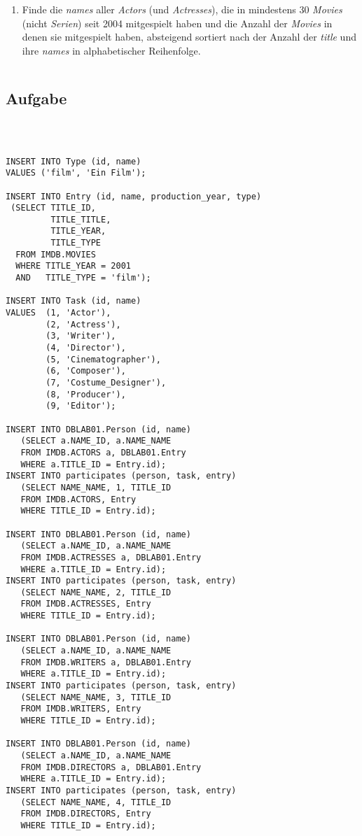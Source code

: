 \documentclass[11pt,a4paper,DIV=9]{scrartcl}
\newcounter{temp}
\newcommand{\aufgabe}[1]{
  \setcounter{temp}{\value{subsection}}
  \setcounter{subsection}{#1}
  \addtocounter{subsection}{-1}
  \subsection{Aufgabe}
  \setcounter{subsection}{\value{temp}}
}
\begin{document}
\begin{enumerate}
\item Finde die \textit{names} aller \textit{Actors} (und \textit{Actresses}), die in mindestens 30 \textit{Movies} (nicht \textit{Serien}) seit 2004 mitgespielt haben und die Anzahl der \textit{Movies} in denen sie mitgespielt haben, absteigend sortiert nach der Anzahl der \textit{title} und ihre \textit{names} in alphabetischer Reihenfolge.
\begin{lstlisting}
\end{lstlisting}
\end{enumerate}

\aufgabe{4}
\begin{lstlisting}



INSERT INTO Type (id, name)
VALUES ('film', 'Ein Film');

INSERT INTO Entry (id, name, production_year, type)
 (SELECT TITLE_ID,
         TITLE_TITLE,
         TITLE_YEAR,
         TITLE_TYPE
  FROM IMDB.MOVIES
  WHERE TITLE_YEAR = 2001
  AND   TITLE_TYPE = 'film');

INSERT INTO Task (id, name)
VALUES  (1, 'Actor'),
        (2, 'Actress'),
        (3, 'Writer'),
        (4, 'Director'),
        (5, 'Cinematographer'),
        (6, 'Composer'),
        (7, 'Costume_Designer'),
        (8, 'Producer'),
        (9, 'Editor');

INSERT INTO DBLAB01.Person (id, name)
   (SELECT a.NAME_ID, a.NAME_NAME
   FROM IMDB.ACTORS a, DBLAB01.Entry
   WHERE a.TITLE_ID = Entry.id);
INSERT INTO participates (person, task, entry)
   (SELECT NAME_NAME, 1, TITLE_ID
   FROM IMDB.ACTORS, Entry
   WHERE TITLE_ID = Entry.id);

INSERT INTO DBLAB01.Person (id, name)
   (SELECT a.NAME_ID, a.NAME_NAME
   FROM IMDB.ACTRESSES a, DBLAB01.Entry
   WHERE a.TITLE_ID = Entry.id);
INSERT INTO participates (person, task, entry)
   (SELECT NAME_NAME, 2, TITLE_ID
   FROM IMDB.ACTRESSES, Entry
   WHERE TITLE_ID = Entry.id);

INSERT INTO DBLAB01.Person (id, name)
   (SELECT a.NAME_ID, a.NAME_NAME
   FROM IMDB.WRITERS a, DBLAB01.Entry
   WHERE a.TITLE_ID = Entry.id);
INSERT INTO participates (person, task, entry)
   (SELECT NAME_NAME, 3, TITLE_ID
   FROM IMDB.WRITERS, Entry
   WHERE TITLE_ID = Entry.id);

INSERT INTO DBLAB01.Person (id, name)
   (SELECT a.NAME_ID, a.NAME_NAME
   FROM IMDB.DIRECTORS a, DBLAB01.Entry
   WHERE a.TITLE_ID = Entry.id);
INSERT INTO participates (person, task, entry)
   (SELECT NAME_NAME, 4, TITLE_ID
   FROM IMDB.DIRECTORS, Entry
   WHERE TITLE_ID = Entry.id);


\end{lstlisting}
\end{document}
